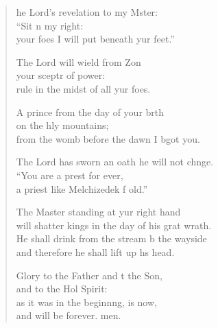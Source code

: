 \begin{verse}
  \begin{patverse}
he Lord’s revelation to my Mster:\Flex\\
“Sit n my right:\Med\\
your foes I will put beneath yur feet.”

The Lord will wield from Z\pointup{\i}on\Flex\\
your sceptr of power:\Med\\
rule in the midst of all yur foes.

A prince from the day of your b\pointup{\i}rth\Flex\\
on the hly mountains;\Med\\
from the womb before the dawn I bgot you.

The Lord has sworn an oath he will not chnge.\Flex\\
“You are a pr\pointup{\i}est for ever,\Med\\
a priest like Melchizedek f old.”

The Master standing at yur right hand\Med\\
will shatter kings in the day of his grat wrath.\\
He shall drink from the stream b the wayside\Med\\
and therefore he shall lift up h\pointup{\i}s head.

Glory to the Father and t the Son,\Med\\
and to the Hol Spirit:\\
as it was in the beginn\pointup{\i}ng, is now,\Med\\
and will be forever. men.
  \end{patverse}
\end{verse}
